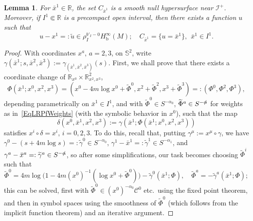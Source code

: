 \documentclass[reqno,11pt,letterpaper]{amsart}
\numberwithin{equation}{section}
\numberwithin{figure}{section}
\newtheorem{lemma}[thm]{Lemma}
\theoremstyle{definition}
\theoremstyle{remark}
\newcommand{\mc}{\mathcal}
\newcommand{\cC}{\mc C}
\newcommand{\ms}{\mathscr}
\newcommand{\scri}{\ms I}
\newcommand{\R}{\mathbb{R}}
\newcommand{\Sph}{\mathbb{S}}
\newcommand{\slalpha}{\slashed{\alpha}{}}
\newcommand{\wt}{\widetilde}
\newcommand{\bop}{{\mathrm{b}}}
\newcommand{\Hb}{H_{\bop}}
\begin{document}
\begin{lemma}
\label{LemmaLRCongr}
  For $\bar x^1\in\R$, the set $C_{\bar x^1}$ is a smooth null hypersurface near $\scri^+$. Moreover, if $I^1\Subset\R$ is a precompact open interval, then there exists a function $u$ such that
  \begin{equation}
  \label{EqLRCongr}
    u-x^1=:\wt u\in\rho_I^{b'_I-0}\Hb^\infty(M); \quad
    C_{\bar x^1} = \{ u=\bar x^1 \},\ \ \bar x^1\in I^1.
  \end{equation}
\end{lemma}
\begin{proof}
  With coordinates $x^a$, $a=2,3$, on $\Sph^2$, write $\gamma(\bar x^1;s,\bar x^2,\bar x^3) := \gamma_{(\bar x^1,\bar x^2,\bar x^3)}(s)$. First, we shall prove that there exists a coordinate change of $\R_{x^0}\times\R^2_{x^2,x^3}$,
  \begin{equation}
  \label{EqLRCongrPhi}
    \Phi(\bar x^1;x^0,x^2,x^3)=(x^0-4 m\log x^0+\wt\Phi^0,x^2+\wt\Phi^2,x^3+\wt\Phi^3)=:(\Phi^0,\Phi^2,\Phi^3),
  \end{equation}
  depending parametrically on $\bar x^1\in I^1$, and with $\wt\Phi^0\in S^{-\alpha_0}$, $\wt\Phi^a\in S^{-\slalpha}$ for weights as in~\eqref{EqLRPfWeights} (with the symbolic behavior in $x^0$), such that the map
  \[
    \delta(x^0,\bar x^1,x^2,x^3) := \gamma(\bar x^1;\Phi(\bar x^1;x^0,x^2,x^3))
  \]
  satisfies $x^i\circ\delta=x^i$, $i=0,2,3$. To do this, recall that, putting $\gamma^\mu:=x^\mu\circ\gamma$, we have $\gamma^0-(s+4 m\log s)=:\wt\gamma^0\in S^{-\alpha_0}$, $\gamma^1-\bar x^1=:\wt\gamma^1\in S^{-\alpha_1}$, and $\gamma^a-\bar x^a=:\wt\gamma^a\in S^{-\slalpha}$, so after some simplifications, our task becomes choosing $\wt\Phi^i$ such that
  \begin{equation}
  \label{EqLRCongrPhiIt}
    \wt\Phi^0 = 4 m\log\bigl(1-4 m(x^0)^{-1}(\log x^0+\wt\Phi^0)\bigr)-\wt\gamma^0(\bar x^1;\Phi), \quad
    \wt\Phi^a = -\wt\gamma^a(\bar x^1;\Phi);
  \end{equation}
  this can be solved, first with $\wt\Phi^0\in(x^0)^{-\alpha_0}\cC^0$ etc.\ using the fixed point theorem, and then in symbol spaces using the smoothness of $\wt\Phi^0$ (which follows from the implicit function theorem) and an iterative argument.
  

\end{proof}
\end{document}
